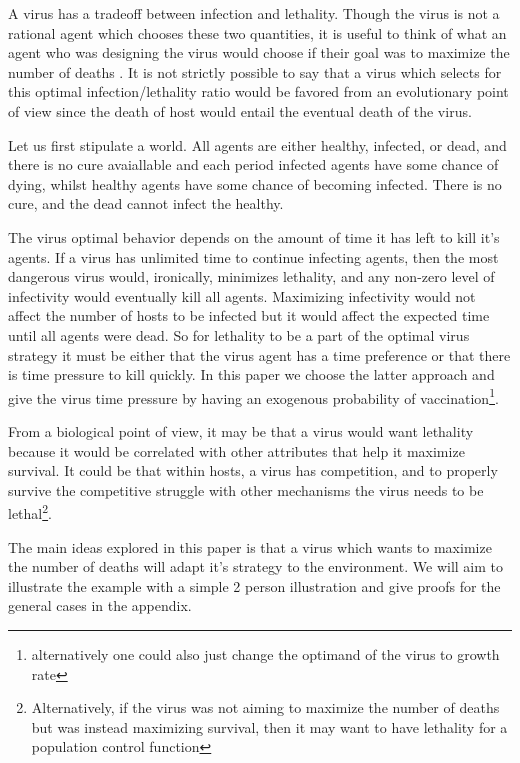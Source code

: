 \documentclass[12pt]{report}
\numberwithin{equation}{section}
\begin{document}
A virus has a tradeoff between infection and lethality. Though the virus is not a rational agent which chooses these two quantities, it is useful to think of what an agent who was designing the virus would choose if their goal was to maximize the number of deaths . It is not strictly possible to say that a virus which selects for this optimal infection/lethality ratio would be favored from an evolutionary point of view since the death of host would entail the eventual death of the virus. 

Let us first stipulate a world. All agents are either healthy, infected, or dead, and there is no cure avaiallable and each period infected agents have some chance of dying, whilst healthy agents have some chance of becoming infected. There is no cure, and the dead cannot infect the healthy. 

The virus optimal behavior depends on the amount of time it has left to kill it's agents. If a virus has unlimited time to continue infecting agents, then the most dangerous virus would, ironically, minimizes lethality, and any non-zero level of infectivity would eventually kill all agents. Maximizing infectivity would not affect the number of hosts to be infected but it would affect the expected time until all agents were dead. So for lethality to be a part of the optimal virus strategy it must be either that the virus agent has a time preference or that there is time pressure to kill quickly. In this paper we choose the latter approach and give the virus time pressure by having an exogenous probability of vaccination\footnote{alternatively one could also just change the optimand of the virus to growth rate}.

From a biological point of view, it may be that a virus would want lethality because it would be correlated with other attributes that help it maximize survival. It could be that within hosts, a virus has competition, and to properly survive the competitive struggle with other mechanisms the virus needs to be lethal\footnote{Alternatively, if the virus was not aiming to maximize the number of deaths but was instead maximizing survival, then it may want to have lethality for a population control function}.

The main ideas explored in this paper is that a virus which wants to maximize the number of deaths will adapt it's strategy to the environment. We will aim to illustrate the example with a simple 2 person illustration and give proofs for the general cases in the appendix. 
\end{document}
